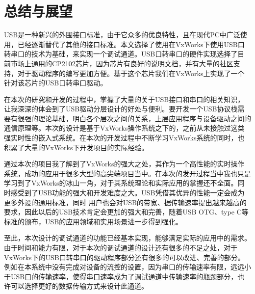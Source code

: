\chapter{总结与展望}

	USB是一种新兴的外围接口标准，由于它众多的优良特性，且在现代PC中广泛使用，已经逐渐替代了其他的接口标准。本文选择了使用在VxWorks下使用USB口转串口的技术为基础，来实现一个调试通道。USB口转串口的硬件实现选择了目前市场上通用的CP2102芯片，因为芯片有良好的说明文档，并有大量的社区支持，对于驱动程序的编写更加方便。基于这个芯片我们在VxWorks上实现了一个针对该芯片的USB口转串口驱动。
	
	在本次的研究和开发的过程中，掌握了大量的关于USB接口和串口的相关知识，让我深深的体会到了USB驱动分层设计的好处与便利。要开发一个USB协议栈需要有很强的理论基础，明白各个层次之间的关系，上层应用程序与设备驱动之间的通信原理等。本次的设计是基于VxWorks操作系统之下的，之前从未接触过这类强实时性的嵌入式系统。在本次的开发过程中不断学习VxWorks系统的同时，也积累了大量的VxWorks下开发项目的实际经验。

	通过本次的项目我了解到了VxWorks的强大之处，其作为一个高性能的实时操作系统，成功的应用于很多大型的高尖端项目当中。在本次的发开过程当中我也只是学习到了VxWorks的冰山一角，对于其系统理论和实际应用的掌握还不全面。同时感受到了USB功能的强大和开发难度之大。USB凭借其优异的性能一定会成为更多外设的通用标准，同时	
用户也会对USB的带宽、据传输速率提出越来越高的要求，因此以后的USB技术肯定会更加的强大和完善，随着USB OTG、type C等标准的颁布，USB的应用领域和实用场景进一步得到强化。
	
	至此，本次设计的调试通道的功能已经基本实现，能够满足实际的应用中的需求。由于时间和能力有限，对于本次的调试通道的设计还有很多的不足之处，对于VxWorks下的USB口转串口的驱动程序部分还有很多的可以改进、完善的部分。例如在本系统中没有完成对设备的流控的设置，因为串口的传输速率有限，远远小于USB口的传输速率，使得串口速率成为了调试通道中传输速率的瓶颈部分，也许可以选择更好的数据传输方式来设计此通道。 
	